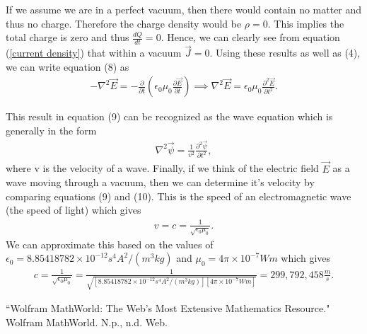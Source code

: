 \documentclass[11pt]{article}
\begin{document}
If we assume we are in a perfect vacuum, then there would contain no matter and thus no charge. Therefore the charge density would be $\rho=0$. This implies the total charge is zero and thus $\frac{dQ}{dt}=0$. Hence, we can clearly see from equation (\ref{current density}) that within a vacuum $\vec{J}=0$. Using these results as well as (4), we can write equation (8) as
\begin{align}
-\nabla^2\vec{E} = -\frac{\partial}{\partial t}\left(\epsilon_0\mu_0\frac{\partial \vec{E}}{\partial t}\right) \implies \nabla^2\vec{E} = \epsilon_0\mu_0\frac{\partial^2 \vec{E}}{\partial t^2}.
\end{align}

This result in equation (9) can be recognized as the wave equation which is generally in the form
\begin{align}
\nabla^2\vec{\psi} = \frac{1}{v^2}\frac{\partial^2 \vec{\psi}}{\partial t^2},
\end{align}
where v is the velocity of a wave. Finally, if we think of the electric field $\vec{E}$ as a wave moving through a vacuum, then we can determine it's velocity by comparing equations (9) and (10). This is the speed of an electromagnetic wave (the speed of light) which gives
\begin{align}
v=c=\frac{1}{\sqrt{\epsilon_0\mu_0}}.
\end{align}
We can approximate this based on the values of $\epsilon_0 = 8.85418782 \times 10^{-12}  s^4 A^2/(m^3 kg)$ and $\mu_0 =4\pi \times 10^{-7} Wm$ which gives
\begin{align}
c=\frac{1}{\sqrt{\epsilon_0\mu_0}} = \frac{1}{\sqrt{[8.85418782 \times 10^{-12}  s^4 A^2/(m^3 kg)][4\pi \times 10^{-7} Wm]}} = \boxed{299,792,458 \frac{m}{s}}.
\end{align}


\begin{thebibliography}{9}
	 ``Wolfram MathWorld: The Web's Most Extensive Mathematics Resource." Wolfram MathWorld. N.p., n.d. Web. 
\end{thebibliography}


\end{document}

